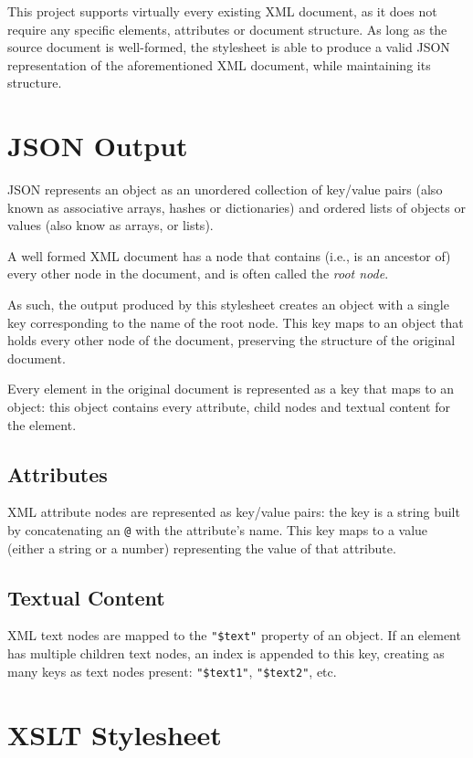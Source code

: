 \documentclass[twocolumn,twoside,10pt,a4paper]{article}
\begin{document}
This project supports virtually every existing XML document, as it does not require any specific elements, attributes or document structure. As long as the source document is well-formed, the stylesheet is able to produce a valid JSON representation of the aforementioned XML document, while maintaining its structure.

\section{JSON Output}\label{sec:json-output}


JSON represents an object as an unordered collection of key/value pairs (also known as associative arrays, hashes or dictionaries) and ordered lists of objects or values (also know as arrays, or lists).

A well formed XML document has a node that contains (i.e., is an ancestor of) every other node in the document, and is often called the \emph{root node}.

As such, the output produced by this stylesheet creates an object with a single key corresponding to the name of the root node. This key maps to an object that holds every other node of the document, preserving the structure of the original document.

Every element in the original document is represented as a key that maps to an object: this object contains every attribute, child nodes and textual content for the element. 

\subsection{Attributes}

XML attribute nodes are represented as key/value pairs: the key is a string built by concatenating an \verb!@! with the attribute's name. This key maps to a value (either a string or a number) representing the value of that attribute.

\subsection{Textual Content}

XML text nodes are mapped to the \verb!"$text"! property of an object. If an element has multiple children text nodes, an index is appended to this key, creating as many keys as text nodes present: \verb!"$text1"!, \verb!"$text2"!, etc.

\section{XSLT Stylesheet}\label{sec:xslt-stylesheet}
\end{document}
